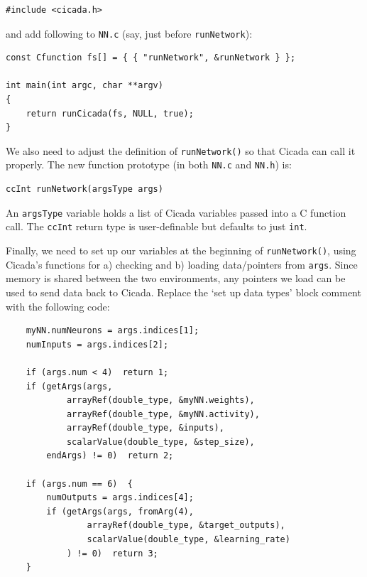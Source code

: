 \documentclass{article}
\newenvironment{code}{
       \begin{list}{}{
               \setlength{\leftmargin}{.4in}
               \setlength{\rightmargin}{0in}
               \setlength{\topsep}{.2in}
       }
       \small
       \item[] }
       { \end{list}   }
\begin{document}
\begin{code} \begin{verbatim}
#include <cicada.h>
\end{verbatim} \end{code}

\noindent and add following to \verb#NN.c# (say, just before \verb#runNetwork#):

\begin{code} \begin{verbatim}
const Cfunction fs[] = { { "runNetwork", &runNetwork } };

int main(int argc, char **argv)
{
    return runCicada(fs, NULL, true);
}
\end{verbatim} \end{code}

\noindent We also need to adjust the definition of \verb#runNetwork()# so that Cicada can call it properly.  The new function prototype (in both \verb#NN.c# and \verb#NN.h#) is:

\begin{code} \begin{verbatim}
ccInt runNetwork(argsType args)
\end{verbatim} \end{code}

\noindent An \verb#argsType# variable holds a list of Cicada variables passed into a C function call.  The \verb#ccInt# return type is user-definable but defaults to just \verb#int#.

Finally, we need to set up our variables at the beginning of \verb#runNetwork()#, using Cicada's functions for a) checking and b) loading data/pointers from \verb#args#.  Since memory is shared between the two environments, any pointers we load can be used to send data back to Cicada.  Replace the `set up data types' block comment with the following code:

\begin{code} \begin{verbatim}
    myNN.numNeurons = args.indices[1];
    numInputs = args.indices[2];
    
    if (args.num < 4)  return 1;
    if (getArgs(args,
            arrayRef(double_type, &myNN.weights),
            arrayRef(double_type, &myNN.activity),
            arrayRef(double_type, &inputs),
            scalarValue(double_type, &step_size),
        endArgs) != 0)  return 2;
    
    if (args.num == 6)  {
        numOutputs = args.indices[4];
        if (getArgs(args, fromArg(4),
                arrayRef(double_type, &target_outputs),
                scalarValue(double_type, &learning_rate)
            ) != 0)  return 3;
    }
\end{verbatim} \end{code}
\end{document}
